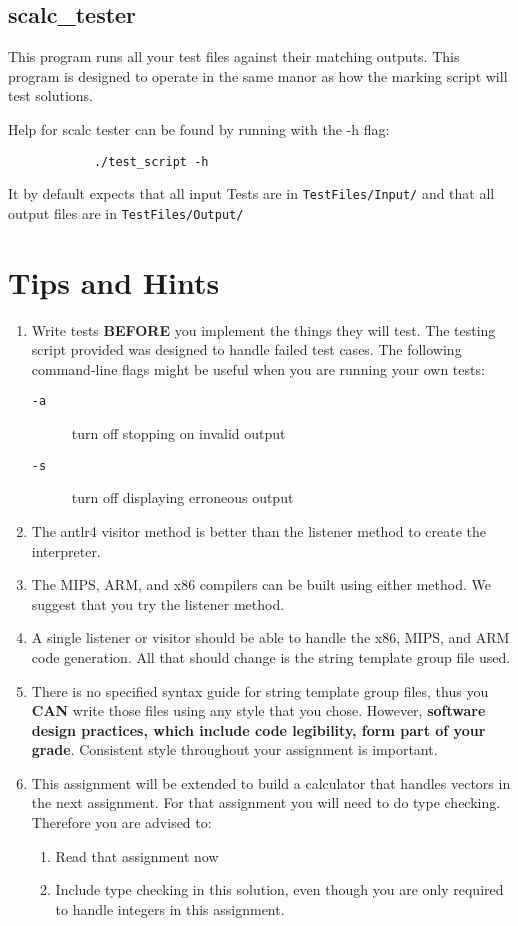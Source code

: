 \documentclass{article}
\begin{document}
	\subsection{scalc\_tester}
	
		This program runs all your test files against their matching outputs. This program is designed to operate in the
		same manor as how the marking script will test solutions.
		
		Help for scalc tester can be found by running with the -h flag:
		
		\begin{lstlisting}
			./test_script -h
		\end{lstlisting}
		
		It by default expects that all input Tests are in \texttt{TestFiles/Input/} and that  all output files are in
		\texttt{TestFiles/Output/}




\section{Tips and Hints}

	\begin{enumerate}
		\item Write tests \textbf{BEFORE} you implement the things they will test. The testing script provided was
		designed to handle failed test cases.  The following command-line flags might be useful when you are running your own tests:
		\begin{description}
			\item[{\tt -a}] turn off stopping on invalid output
			\item[{\tt -s}]  turn off displaying erroneous output 
		\end{description}
		\item The antlr4 visitor method is better than the listener method to create the interpreter.
		\item The MIPS, ARM, and x86 compilers can be built using either method. We suggest that you try the listener method.
		\item A single listener or visitor should be able to handle the x86, MIPS, and ARM code generation. All that should
		change is the string template group file used.
		\item There is no specified syntax guide for string template group files, thus you \textbf{CAN} write those files using
		any style that you chose. However, \textbf{software design practices, which include code legibility, form part of your grade}.
		Consistent style throughout your assignment is important.
		\item This assignment will be extended to build a calculator that handles vectors in the next assignment. For that assignment
		you will need to do type checking. Therefore you are advised to:
		\begin {enumerate}
			\item Read that assignment now
			\item Include type checking in this solution, even though you are only
			required to handle integers in this assignment.
		\end {enumerate}
	\end{enumerate}
\end{document}
